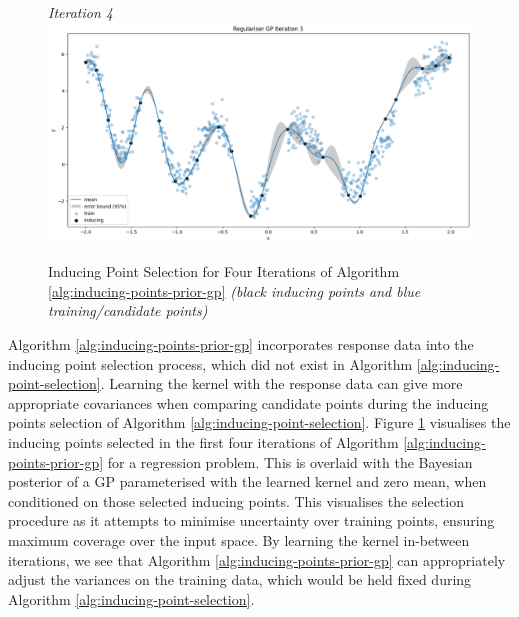 \documentclass{article}
\numberwithin{equation}{section}
\begin{document}
\begin{figure}[h!]
\begin{minipage}{.5\textwidth}
  \textit{Iteration 4}
  \includegraphics[width=\linewidth, trim={0 0 0 0.77cm},clip]{thesis_report/figures/inducing_points_kernel/iteration-3/prediction.png}
\end{minipage}%
\caption{
Inducing Point Selection for Four Iterations of Algorithm \ref{alg:inducing-points-prior-gp} \textit{(black inducing points and blue training/candidate points)}
}
\label{inducing-points-and-kernel}
\end{figure}

Algorithm \ref{alg:inducing-points-prior-gp} incorporates response data into the inducing point selection process, which did not exist in Algorithm \ref{alg:inducing-point-selection}. 
Learning the kernel with the response data can give more appropriate covariances when comparing candidate points during the inducing points selection of Algorithm \ref{alg:inducing-point-selection}. 
Figure \ref{inducing-points-and-kernel} visualises the inducing points selected in the first four iterations of Algorithm \ref{alg:inducing-points-prior-gp} for a regression problem.
This is overlaid with the Bayesian posterior of a GP parameterised with the learned kernel and zero mean, when conditioned on those selected inducing points. 
This visualises the selection procedure as it attempts to minimise uncertainty over training points, ensuring maximum coverage over the input space.
By learning the kernel in-between iterations, we see that Algorithm \ref{alg:inducing-points-prior-gp} can appropriately adjust the variances on the training data, which would be held fixed during Algorithm \ref{alg:inducing-point-selection}.
\end{document}
